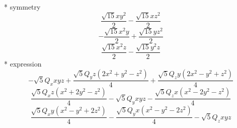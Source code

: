 \documentclass[fleqn,8pt]{jsarticle}
\begin{document}
\noindent\quad ** symmetry
\begin{dmath*}
\frac{\sqrt{15} x y^{2}}{2} - \frac{\sqrt{15} x z^{2}}{2}
\end{dmath*}
\begin{dmath*}
- \frac{\sqrt{15} x^{2} y}{2} + \frac{\sqrt{15} y z^{2}}{2}
\end{dmath*}
\begin{dmath*}
\frac{\sqrt{15} x^{2} z}{2} - \frac{\sqrt{15} y^{2} z}{2}
\end{dmath*}
\noindent\quad ** expression
\begin{dmath*}
- \sqrt{5} Q_{x} x y z + \frac{\sqrt{5} Q_{y} z \left(2 x^{2} + y^{2} - z^{2}\right)}{4} + \frac{\sqrt{5} Q_{z} y \left(2 x^{2} - y^{2} + z^{2}\right)}{4}
\end{dmath*}
\begin{dmath*}
\frac{\sqrt{5} Q_{x} z \left(x^{2} + 2 y^{2} - z^{2}\right)}{4} - \sqrt{5} Q_{y} x y z - \frac{\sqrt{5} Q_{z} x \left(x^{2} - 2 y^{2} - z^{2}\right)}{4}
\end{dmath*}
\begin{dmath*}
\frac{\sqrt{5} Q_{x} y \left(x^{2} - y^{2} + 2 z^{2}\right)}{4} - \frac{\sqrt{5} Q_{y} x \left(x^{2} - y^{2} - 2 z^{2}\right)}{4} - \sqrt{5} Q_{z} x y z
\end{dmath*}
\end{document}
